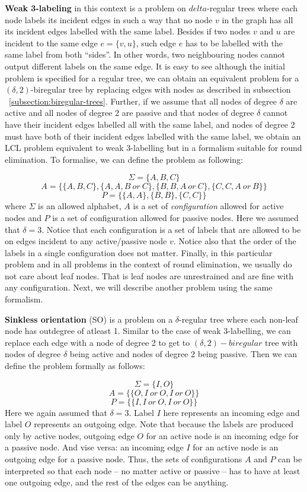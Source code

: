 \textbf{Weak 3-labeling} in this context is a problem on $delta$-regular trees where
each node labels its incident edges in such a way that no node $v$ in the graph
has all its incident edges labelled with the same label. Besides if two
nodes $v$ and $u$ are incident to the same edge $e = \{v, u\}$, such
edge $e$ has to be labelled with the same label from both ``sides''. In other words,
two neighbouring nodes cannot output different labels on the same edge.
It is easy to see although the initial problem is specified for a regular
tree, we can obtain an equivalent problem for a $(\delta, 2)$-biregular tree
by replacing edges with nodes as described in subsection ~\ref{subsection:biregular-trees}.
Further, if we assume that all nodes of degree $\delta$ are active and all nodes of 
degree 2 are passive and that nodes of degree $\delta$ cannot have their incident
edges labelled all with the same label, and nodes of degree 2 must have both of their
incident edges labelled with the same label, we obtain an LCL problem equivalent to
weak 3-labelling but in a formalism suitable for round elimination. To formalise, we
can define the problem as following:

$$\Sigma = \{A, B, C\}$$
$$A = \{ \{A, B, C\}, \{A, A, B~or~C\}, \{B, B, A~or~C\}, \{C, C, A~or~B\} \}$$
$$P = \{ \{A, A\}, \{B, B\}, \{C, C\}\}$$
where $\Sigma$ is an allowed alphabet, $A$ is a set of \emph{configuration}
allowed for active nodes and $P$ is a set of configuration allowed for
passive nodes. Here we assumed that $\delta = 3$. Notice that each
configuration is a set of labels that are allowed to be on edges 
incident to any active/passive node $v$. Notice also that the order of
the labels in a single configuration does not matter. Finally, in this particular problem
and in all problems in the context of round elimination, we usually do not care about
leaf nodes. That is leaf nodes are unrestrained and are fine with any 
configuration.  Next, we will
describe another problem using the same formalism.

\textbf{Sinkless orientation} (SO) is a problem on a $\delta$-regular tree
where each non-leaf node has outdegree of atleast 1. Similar to the case of weak 3-labelling,
we can replace each edge with a node of degree 2 to get to $(\delta, 2)-biregular$ tree with
nodes of degree $\delta$ being active and nodes of degree 2 being passive.
Then we can define the problem formally as follows:

$$\Sigma = \{I, O\}$$
$$A = \{ \{O, I~or~O, I~or~O\} \}$$
$$P = \{ \{I, I~or~O, I~or~O\}\}$$
Here we again assumed that $\delta = 3$. Label $I$ here represents
an incoming edge and label $O$ represents an outgoing edge.
Note that because the labels are produced only by active nodes,
outgoing edge $O$ for an active node is an incoming edge for a 
passive node. And vise versa: an incoming edge $I$ for an active node
is an outgoing edge for a passive node. Thus, the sets of configurations
$A$ and $P$ can be interpreted so that each node -- no matter active or passive --
has to have at least one outgoing edge, and the rest of the edges can be anything.

